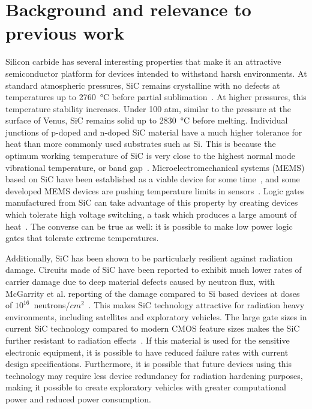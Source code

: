 \documentclass[12pt]{amsart}
\begin{document}
 	
 	
 	\section{Background and relevance to previous work}
 	
 	Silicon carbide has several interesting properties that make it an attractive semiconductor platform for devices intended to withstand harsh environments.  At standard atmospheric pressures, SiC remains crystalline with no defects at temperatures up to \SI{2760}{\degreeCelsius} before partial sublimation~\cite{haase_si-c_1985}.  At higher pressures, this temperature stability increases.  Under 100 atm, similar to the pressure at the surface of Venus, SiC remains solid up to \SI{2830}{\degreeCelsius} before melting.  Individual junctions of p-doped and n-doped SiC material have a much higher tolerance for heat than more commonly used substrates such as Si.  This is because the optimum working temperature of SiC is very close to the highest normal mode vibrational temperature, or band gap~\cite{chelnokov_high_1997}.  Microelectromechanical systems (MEMS) based on SiC have been established as a viable device for some time~\cite{sarro_silicon_2000}, and some developed MEMS devices are pushing temperature limits in sensors~\cite{okojie_zero_2010}.  Logic gates manufactured from SiC can take advantage of this property by creating devices which tolerate high voltage switching, a task which produces a large amount of heat~\cite{weitzel_silicon_1996}.  The converse can be true as well: it is possible to make low power logic gates that tolerate extreme temperatures.   
 	
 	Additionally, SiC has been shown to be particularly resilient against radiation damage.  Circuits made of SiC have been reported to exhibit much lower rates of carrier damage due to deep material defects caused by neutron flux, with McGarrity et al. reporting  of the damage compared to Si based devices at doses of $10^{16}$~neutrons/$cm^2$~\cite{mcgarrity_silicon_1992-1}.  This makes SiC technology attractive for radiation heavy environments, including satellites and exploratory vehicles.  The large gate sizes in current SiC technology compared to modern CMOS feature sizes makes the SiC further resistant to radiation effects~\cite{zhou2004transistor}.  If this material is used for the sensitive electronic equipment, it is possible to have reduced failure rates with current design specifications.  Furthermore, it is possible that future devices using this technology may require less device redundancy for radiation hardening purposes, making it possible to create exploratory vehicles with greater computational power and reduced power consumption.  
 	
\end{document}
